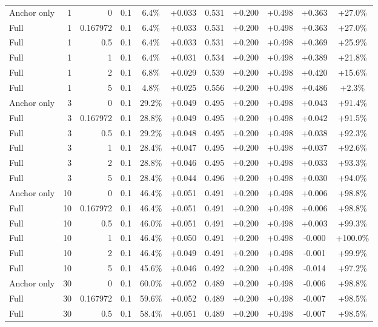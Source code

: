 \begin{table}[htbp]
\begin{tabular}{lrrrccccccc}
Anchor only & 1 & 0 & 0.1 & 6.4\% & +0.033 & 0.531 & +0.200 & +0.498 & +0.363 & +27.0\% \\
Full & 1 & 0.167972 & 0.1 & 6.4\% & +0.033 & 0.531 & +0.200 & +0.498 & +0.363 & +27.0\% \\
Full & 1 & 0.5 & 0.1 & 6.4\% & +0.033 & 0.531 & +0.200 & +0.498 & +0.369 & +25.9\% \\
Full & 1 & 1 & 0.1 & 6.4\% & +0.031 & 0.534 & +0.200 & +0.498 & +0.389 & +21.8\% \\
Full & 1 & 2 & 0.1 & 6.8\% & +0.029 & 0.539 & +0.200 & +0.498 & +0.420 & +15.6\% \\
Full & 1 & 5 & 0.1 & 4.8\% & +0.025 & 0.556 & +0.200 & +0.498 & +0.486 & +2.3\% \\
Anchor only & 3 & 0 & 0.1 & 29.2\% & +0.049 & 0.495 & +0.200 & +0.498 & +0.043 & +91.4\% \\
Full & 3 & 0.167972 & 0.1 & 28.8\% & +0.049 & 0.495 & +0.200 & +0.498 & +0.042 & +91.5\% \\
Full & 3 & 0.5 & 0.1 & 29.2\% & +0.048 & 0.495 & +0.200 & +0.498 & +0.038 & +92.3\% \\
Full & 3 & 1 & 0.1 & 28.4\% & +0.047 & 0.495 & +0.200 & +0.498 & +0.037 & +92.6\% \\
Full & 3 & 2 & 0.1 & 28.8\% & +0.046 & 0.495 & +0.200 & +0.498 & +0.033 & +93.3\% \\
Full & 3 & 5 & 0.1 & 28.4\% & +0.044 & 0.496 & +0.200 & +0.498 & +0.030 & +94.0\% \\
Anchor only & 10 & 0 & 0.1 & 46.4\% & +0.051 & 0.491 & +0.200 & +0.498 & +0.006 & +98.8\% \\
Full & 10 & 0.167972 & 0.1 & 46.4\% & +0.051 & 0.491 & +0.200 & +0.498 & +0.006 & +98.8\% \\
Full & 10 & 0.5 & 0.1 & 46.0\% & +0.051 & 0.491 & +0.200 & +0.498 & +0.003 & +99.3\% \\
Full & 10 & 1 & 0.1 & 46.4\% & +0.050 & 0.491 & +0.200 & +0.498 & -0.000 & +100.0\% \\
Full & 10 & 2 & 0.1 & 46.4\% & +0.049 & 0.491 & +0.200 & +0.498 & -0.001 & +99.9\% \\
Full & 10 & 5 & 0.1 & 45.6\% & +0.046 & 0.492 & +0.200 & +0.498 & -0.014 & +97.2\% \\
Anchor only & 30 & 0 & 0.1 & 60.0\% & +0.052 & 0.489 & +0.200 & +0.498 & -0.006 & +98.8\% \\
Full & 30 & 0.167972 & 0.1 & 59.6\% & +0.052 & 0.489 & +0.200 & +0.498 & -0.007 & +98.5\% \\
Full & 30 & 0.5 & 0.1 & 58.4\% & +0.051 & 0.489 & +0.200 & +0.498 & -0.007 & +98.5\% \\

\end{tabular}
\end{table}
